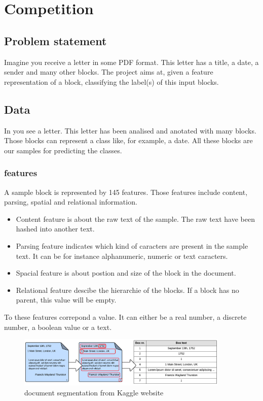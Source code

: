 




\section{Competition}

	\subsection{Problem statement}
	Imagine you receive a letter in some PDF format. This letter has a title, a date, a sender and many other blocks. The project aims at, given a feature representation of a block, classifying the label(s) of this input blocks.




	\subsection{Data}
	\label{sec:dataset}
		In  you see a letter. This letter has been analised and anotated with  many blocks. Those blocks can represent a class like, for example, a date. All these blocks are our samples for predicting the classes.

		\subsubsection{features}
			A sample block is represented by 145 features. Those features include content, parsing, spatial and relational information.

			\begin{itemize}
				\item Content feature is about the raw text of the sample. The raw text have been hashed into another text.
				\item Parsing feature indicates which kind of caracters are present in the sample text. It can be for instance alphanumeric, numeric or text caracters.
				\item Spacial feature is about postion and size of the block in the document.
			 	\item Relational feature descibe the hierarchie of the blocks. If a block has no parent, this value will be empty.
	\end{itemize}

		To these features correpond a value. It can either be a real number, a discrete number, a boolean value or a text.


	\begin{figure}[h]
		\begin{center}
			\includegraphics[width=0.9\textwidth]{FeatureExtraction1.png}
	    \end{center}
		\caption{document segmentation from Kaggle website \label{fig:FeatureExtraction1}}
	\end{figure}

